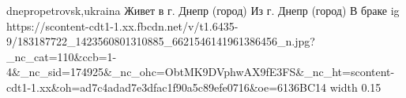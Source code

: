  
 
 
 
 

\par
dnepropetrovsk,ukraina
Живет в г. Днепр (город)
Из г. Днепр (город)
В браке
\ifcmt
  ig https://scontent-cdt1-1.xx.fbcdn.net/v/t1.6435-9/183187722_1423560801310885_6621546141961386456_n.jpg?_nc_cat=110&ccb=1-4&_nc_sid=174925&_nc_ohc=ObtMK9DVphwAX9fE3FS&_nc_ht=scontent-cdt1-1.xx&oh=ad7c4adad7e3dfac1f90a5c89efe0716&oe=6136BC14
  width 0.15
\fi

